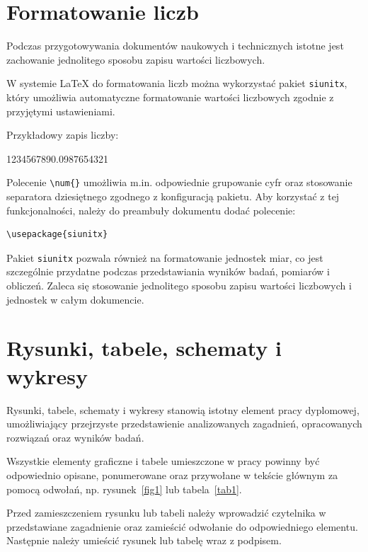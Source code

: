 \section{Formatowanie liczb}

Podczas przygotowywania dokumentów naukowych i technicznych istotne jest zachowanie jednolitego sposobu zapisu wartości liczbowych.

W systemie \LaTeX{} do formatowania liczb można wykorzystać pakiet \texttt{siunitx}, który umożliwia automatyczne formatowanie wartości liczbowych zgodnie z przyjętymi ustawieniami.

Przykładowy zapis liczby:

\begin{center}
    \num{1234567890.0987654321}
\end{center}

Polecenie \verb|\num{}| umożliwia m.in. odpowiednie grupowanie cyfr oraz stosowanie separatora dziesiętnego zgodnego
z konfiguracją pakietu. Aby korzystać z tej funkcjonalności, należy do preambuły dokumentu dodać polecenie:

\begin{verbatim}
\usepackage{siunitx}
\end{verbatim}

Pakiet \texttt{siunitx} pozwala również na formatowanie jednostek miar, co jest szczególnie przydatne podczas przedstawiania wyników badań, pomiarów i obliczeń.  Zaleca się stosowanie jednolitego sposobu zapisu wartości liczbowych i jednostek w całym dokumencie.


\section{Rysunki, tabele, schematy i wykresy}

Rysunki, tabele, schematy i wykresy stanowią istotny element pracy dyplomowej, umożliwiający przejrzyste przedstawienie analizowanych zagadnień, opracowanych rozwiązań oraz wyników badań.

Wszystkie elementy graficzne i tabele umieszczone w pracy powinny być odpowiednio opisane, ponumerowane oraz przywołane w tekście głównym za pomocą odwołań, np. rysunek~\ref{fig1} lub tabela~\ref{tab1}.

Przed zamieszczeniem rysunku lub tabeli należy wprowadzić czytelnika w przedstawiane zagadnienie oraz zamieścić
odwołanie do odpowiedniego elementu. Następnie należy umieścić rysunek lub tabelę wraz z podpisem.

